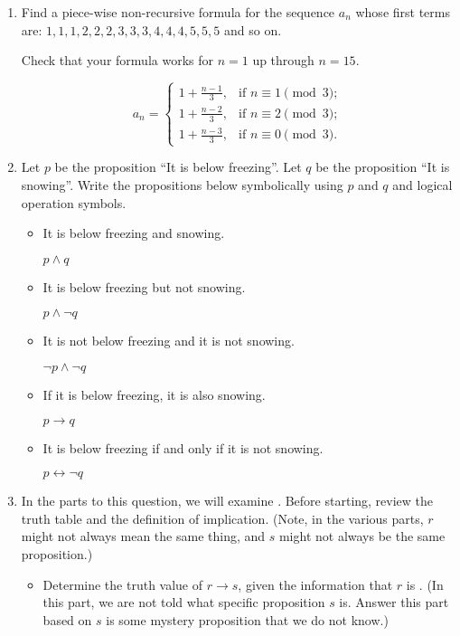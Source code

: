\documentclass{article}
\begin{document}
\begin{enumerate}

    \item
          Find a piece-wise non-recursive formula for the sequence $a_n$ whose first
          terms are: $1,1,1,2,2,2,3,3,3,4,4,4,5,5,5$ and so on.

          Check that your formula works for $n=1$ up through $n=15$.
 
          \[
          a_n = \begin{cases}
                  1+\frac{n-1}{3}, & \text{if } n \equiv 1 \pmod{3}; \\
                  1+\frac{n-2}{3}, & \text{if } n \equiv 2 \pmod{3}; \\
                  1+\frac{n-3}{3}, & \text{if } n \equiv 0 \pmod{3}.
              \end{cases}
          \]

    \newpage

    \item Let $p$ be the proposition ``It is below freezing''. Let $q$ be the proposition
          ``It is snowing''. Write the propositions below symbolically using $p$ and $q$
          and logical operation symbols.
          \begin{itemize}
              \item It is below freezing and snowing.

                    $p \wedge q$
              \item It is below freezing but not snowing.

                    $p \wedge \neg q$
              \item It is not below freezing and it is not snowing.

                    $\neg p \wedge \neg q$
              \item If it is below freezing, it is also snowing.

                    $p \rightarrow q$
              \item It is below freezing if and only if it is not snowing.

                    $p \leftrightarrow \neg q$
          \end{itemize}

    \newpage

    \item In the parts to this question, we will examine . Before
          starting, review the truth table and the definition of implication. (Note, in
          the various parts, $r$ might not always mean the same thing, and $s$ might not
          always be the same proposition.)
          \begin{itemize}
              \item Determine the truth value of $r \rightarrow s$, given the information that $r$
                    is . (In this part, we are not told what specific
                    proposition $s$ is. Answer this part based on $s$ is some mystery proposition
                    that we do not know.)


\end{itemize}
\end{enumerate}
\end{document}
